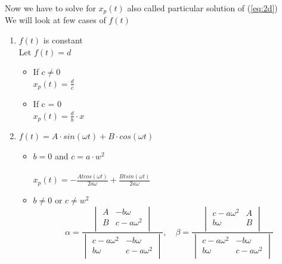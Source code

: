 \documentclass{article}
\begin{document}
\noindent Now we have to solve for $x_p(t)$ also called particular solution of (\ref{eq:2d})\\
We will look at few cases of $f(t)$\\
\begin{enumerate}
    \item $f(t)$ is constant\\
    Let $f(t) = d$\\
    \begin{itemize}
        \item If $c \neq 0$\\
        $x_p(t) = \frac{d}{c}$\\
        \item If c = 0\\
        $x_p(t) = \frac{d}{b}\cdot x$
    \end{itemize}

    \item $f(t) = A\cdot sin(\omega t) + B\cdot cos(\omega t)$\\
    \begin{itemize}
        \item $b = 0$ and $c = a \cdot w^2$\\\\
        $x_p(t) = -\frac{A t cos(\omega t)}{2 a \omega} + \frac{B t sin(\omega t)}{2 a \omega}$\\
        \item $b \neq 0$ or $c \neq w^2$\\
        $$\alpha = \frac{
            \begin{vmatrix}
        A & -b\omega \\
        B & c-a \omega^{2} \\
        \end{vmatrix}}{
            \begin{vmatrix}
            c-a \omega^{2} & -b\omega \\
            b\omega & c-a \omega^{2} \\
             \end{vmatrix}
        }, \quad
        \beta = \frac{
            \begin{vmatrix}
            c-a \omega^{2} & A \\
            b\omega & B \\
            \end{vmatrix}
        }{\begin{vmatrix}
            c-a \omega^{2} & -b\omega \\
            b\omega & c-a \omega^{2} \\
             \end{vmatrix}
        }$$\\


\end{itemize}
\end{enumerate}
\end{document}
